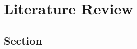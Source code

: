 

\chapter{Literature Review}
\label{chap:chapter2}

\section{Section }\label{sec:SectionChapter2}

